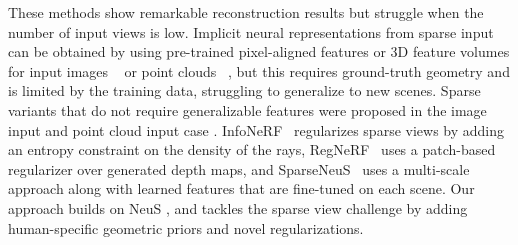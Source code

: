 These methods show remarkable reconstruction results but struggle when the number of input views is low. 
Implicit neural representations from sparse input can be obtained by using pre-trained pixel-aligned features or 3D feature volumes for input images ~\cite{saito2019pifu, saito2020pifuhd, alldieck2022photorealistic, he2020geo, huang2020arch, he2021arch, yu2021pixelnerf, li2023learning, jena2024geotransfer} or point clouds ~\citep{boulch2022poco,williams2022neural,huang2023neural,peng2020convolutional,chibane2020implicit,lionar2021dynamic, ouasfi2023mixing, peng2021shape, ouasfi2022few, ouasfi2024robustifying}, 
but this requires ground-truth geometry and is limited by the training data, struggling to generalize to new scenes. Sparse variants that do not require generalizable features were proposed in the image input \eg \cite{niemeyer2022regnerf, kim2022infonerf, long2022sparseneus, younes2025sparsecraft, li2023regularizing} and point cloud input case \eg \cite{NeuralTPS,sparseocc,nap,ouasfi2024robustneuralreconstructionsparse,williams2021neural}. 
InfoNeRF~\cite{kim2022infonerf} regularizes sparse views by adding an entropy constraint on the density of the rays,  RegNeRF~\cite{niemeyer2022regnerf} uses a patch-based regularizer over generated depth maps, and SparseNeuS~\cite{long2022sparseneus} uses a multi-scale approach along with learned features that are fine-tuned on each scene. 
Our approach builds on NeuS \cite{wang2021neus}, and tackles the sparse view challenge by adding human-specific geometric priors and novel regularizations. 






